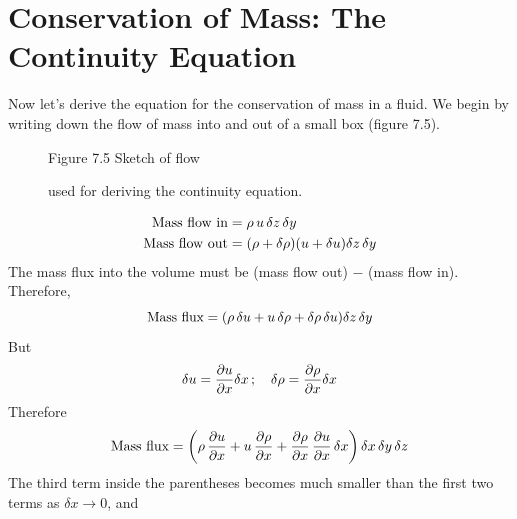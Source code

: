 \section{Conservation of Mass: The Continuity Equation}
Now let's
derive the equation for the conservation of mass in a fluid. We begin
by writing down the flow of mass into and out of a small box (figure
7.5).
\begin{figure}[h!]
\centering
\footnotesize
Figure 7.5 Sketch of flow \rule{0mm}{4ex}used for deriving the
continuity equation.
\label{fig:continuitysketchR}
\vspace{-3ex}
\end{figure}
\begin{align}
\text{Mass flow in} &= \rho \, u \, \delta z \, \delta y \notag  \\
\text{Mass flow out} &= (\rho + \delta \rho ) (u + \delta u) \delta z \,  \delta y \notag
\end{align}
The mass flux into the volume must be (mass flow out) $-$ (mass flow
in). Therefore,
\begin{equation}
\text{Mass flux} = ( \rho \, \delta u + u \, \delta \rho + \delta \rho \, \delta u)  \delta z \,  \delta y \notag
\end{equation}
But
\begin{equation}
\delta u = \frac{\partial u}{\partial x} \delta x \,;\quad \delta \rho = \frac{\partial {\rho}}{\partial x} \delta x \notag
\end{equation}
Therefore
\begin{equation}
\text{Mass flux} = \left(\rho \, \frac{\partial{u}}{\partial{x}} + u\,\frac{\partial{\rho}}{\partial{x}}
+\frac{\partial{\rho}}{\partial{x}}\,\frac{\partial{u}}{\partial{x}}\,\delta{x}\right)\delta{x}\,\delta{y}\,\delta{z}
\notag
\end{equation}
The third term inside the parentheses becomes much smaller than the
first two terms as $\delta x \rightarrow 0$, and
